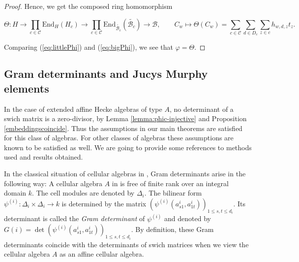 \documentclass[oneside, a4paper, 11pt]{amsart}
\newcommand{\cB}{\mathcal{B}}
\begin{document}
\begin{proof}
Hence, we get the composed ring homomorphism

\begin{equation}\label{eq:bigPhi}
\Theta: H 
\to \prod_{c\in\mathcal{C}} \mathrm{End}_H({H_c})  
\to  \prod_{c\in\mathcal{C}} \mathrm{End}_{\widetilde{\cB_c}}(\widetilde{\cB_c}) 
\to  \cB, \qquad C_w \mapsto \Theta(C_w) = \sum_{c\in \mathcal{C}} \sum_{d\in D_c} \sum_{z\in c} h_{w,d,z} t_z. 
\end{equation}


Comparing (\ref{eq:littlePhi}) and (\ref{eq:bigPhi}), we see that $\varphi=\Theta$.
\end{proof}


\subsection{Gram determinants and Jucys Murphy elements}

In the case of extended affine Hecke algebras of type $A$, no determinant
of a swich matrix is a zero-divisor, by Lemma \ref{lemma:phic-injective} and
Proposition \ref{embeddingscoincide}. Thus the assumptions in our main
theorems are satisfied for this class of algebras. For other classes of
algebras these assumptions are known to be satisfied as well. We are
going to provide some references to methods used and results obtained.

In the classical situation of cellular algebras in \cite{GrahamLehrer}, Gram
determinants arise in the following way: A cellular algebra $A$ in
\cite{GrahamLehrer} is
free of finite rank over an integral domain $k$. The cell modules are denoted
by $\Delta_i$. 
The bilinear form $\psi^{(i)}:\Delta_i \times \Delta_i \to k$ is determined by
the matrix $\left( \psi^{(i)}(a_{s1}^i, a_{1t}^i) \right)_{1\leq s,t\leq d_i}$.
Its determinant is called the \emph{Gram determinant} of $\psi^{(i)}$ and
denoted by
$G(i) = \det\left( \psi^{(i)}(a_{s1}^i, a_{1t}^i) \right)_{1\leq s,t\leq d_i}$. 
By definition, these Gram determinants coincide with the determinants of
swich matrices when we view the cellular algebra $A$ as an affine cellular
algebra.
\end{document}
